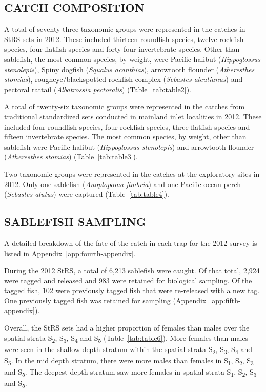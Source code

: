 \documentclass[12pt]{article}\usepackage[]{graphicx}\usepackage[]{color}
\begin{document}
\hypertarget{catch-composition}{%
\subsection{CATCH COMPOSITION}\label{catch-composition}}

A total of seventy-three taxonomic groups were represented in the catches in StRS sets in 2012. These included thirteen roundfish species, twelve rockfish species, four flatfish species and forty-four invertebrate species. Other than sablefish, the most common species, by weight, were Pacific halibut (\emph{Hippoglossus stenolepis}), Spiny dogfish (\emph{Squalus acanthias}), arrowtooth flounder (\emph{Atheresthes stomias}), rougheye/blackspotted rockfish complex (\emph{Sebastes aleutianus}) and pectoral rattail (\emph{Albatrossia pectoralis}) (Table~\ref{tab:table2}).

A total of twenty-six taxonomic groups were represented in the catches from traditional standardized sets conducted in mainland inlet localities in 2012. These included four roundfish species, four rockfish species, three flatfish species and fifteen invertebrate species. The most common species, by weight, other than sablefish were Pacific halibut (\emph{Hippoglossus stenolepis}) and arrowtooth flounder (\emph{Atheresthes stomias}) (Table~\ref{tab:table3}).

Two taxonomic groups were represented in the catches at the exploratory sites in 2012. Only one sablefish (\emph{Anoplopoma fimbria}) and one Pacific ocean perch (\emph{Sebastes alutus}) were captured (Table~\ref{tab:table4}).

\hypertarget{sablefish-sampling}{%
\subsection{SABLEFISH SAMPLING}\label{sablefish-sampling}}

A detailed breakdown of the fate of the catch in each trap for the 2012 survey is listed in Appendix~\ref{app:fourth-appendix}.

During the 2012 StRS, a total of 6,213 sablefish were caught. Of that total, 2,924 were tagged and released and 983 were retained for biological sampling. Of the tagged fish, 102 were previously tagged fish that were re-released with a new tag. One previously tagged fish was retained for sampling (Appendix~\ref{app:fifth-appendix}).

Overall, the StRS sets had a higher proportion of females than males over the spatial strata S\textsubscript{2}, S\textsubscript{3}, S\textsubscript{4} and S\textsubscript{5} (Table~\ref{tab:table6}). More females than males were seen in the shallow depth stratum within the spatial strata S\textsubscript{2}, S\textsubscript{3}, S\textsubscript{4} and S\textsubscript{5}. In the mid depth stratum, there were more males than females in S\textsubscript{1}, S\textsubscript{2}, S\textsubscript{3} and S\textsubscript{5}. The deepest depth stratum saw more females in spatial strata S\textsubscript{1}, S\textsubscript{2}, S\textsubscript{3} and S\textsubscript{5}.
\end{document}
